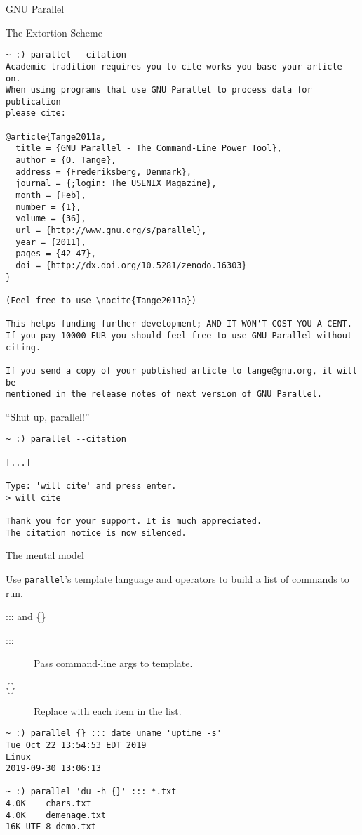\documentclass{beamer}
\renewcommand\big[1]{
  \begin{center}
    \Large{#1}
  \end{center}
}
\begin{document}
\begin{frame}
  \centering\Huge{GNU Parallel}
\end{frame}

\begin{frame}[fragile]
  \big{The Extortion Scheme}
  \tiny
\begin{verbatim}
~ :) parallel --citation
Academic tradition requires you to cite works you base your article on.
When using programs that use GNU Parallel to process data for publication
please cite:

@article{Tange2011a,
  title = {GNU Parallel - The Command-Line Power Tool},
  author = {O. Tange},
  address = {Frederiksberg, Denmark},
  journal = {;login: The USENIX Magazine},
  month = {Feb},
  number = {1},
  volume = {36},
  url = {http://www.gnu.org/s/parallel},
  year = {2011},
  pages = {42-47},
  doi = {http://dx.doi.org/10.5281/zenodo.16303}
}

(Feel free to use \nocite{Tange2011a})

This helps funding further development; AND IT WON'T COST YOU A CENT.
If you pay 10000 EUR you should feel free to use GNU Parallel without citing.

If you send a copy of your published article to tange@gnu.org, it will be
mentioned in the release notes of next version of GNU Parallel.
\end{verbatim}
\end{frame}

\begin{frame}[fragile]
  \big{``Shut up, parallel!''}
\begin{verbatim}
~ :) parallel --citation

[...]

Type: 'will cite' and press enter.
> will cite

Thank you for your support. It is much appreciated.
The citation notice is now silenced.
\end{verbatim}
\end{frame}

\begin{frame}
  \big{The mental model}

  Use \texttt{parallel}'s template language and operators to build a list of commands to run.
\end{frame}

\begin{frame}[fragile]
  \big{::: and \{\}}
  \begin{description}
    \item[:::] Pass command-line args to template.
    \item[\{\}] Replace with each item in the list.
  \end{description}

\begin{verbatim}
~ :) parallel {} ::: date uname 'uptime -s'
Tue Oct 22 13:54:53 EDT 2019
Linux
2019-09-30 13:06:13

~ :) parallel 'du -h {}' ::: *.txt
4.0K	chars.txt
4.0K	demenage.txt
16K	UTF-8-demo.txt
\end{verbatim}
\end{frame}
\end{document}

